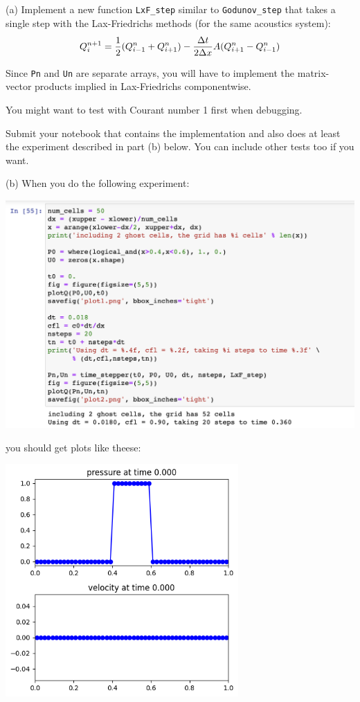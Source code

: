 \documentclass[11pt]{article}
\begin{document}
\vskip 10pt
(a) Implement a new function {\tt LxF\_step} similar to {\tt Godunov\_step}
that takes a single step with the Lax-Friedrichs methods (for the same
acoustics system):  
\[
Q_i^{n+1} =  {\frac{1}{2}}(Q_{i-1}^{n} + Q_{i+1}^{n}) - \frac{\Delta t}{2\Delta x} A(Q_{i+1}^{n}-Q_{i-1}^{n})
\]

Since {\tt Pn} and {\tt Un} are separate arrays, you
will have to implement the matrix-vector products implied in Lax-Friedrichs
componentwise.  

You might want to test with Courant number 1 first when debugging.

Submit your notebook that contains the implementation and also does at least
the experiment described in part (b) below. You can include other tests too
if you want.


\vskip 10pt
(b) When you do the following experiment:

\hfil\includegraphics[width=6.0in]{input.png}\hfil

you should get plots like theese:

\hfil\includegraphics[width=3.5in]{plot1.png}\hfil
\end{document}
